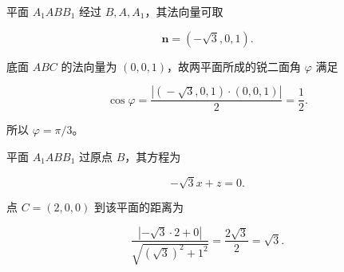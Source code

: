 \begin{answer}

平面 $A_1ABB_1$ 经过 $B,A,A_1$，其法向量可取

\nopagebreak[4]
\[
\boldsymbol n=(-\sqrt3,0,1).
\]

底面 $ABC$ 的法向量为 $(0,0,1)$，故两平面所成的锐二面角 $\varphi$ 满足

\nopagebreak[4]
\[
\cos\varphi
=\frac{|(\!-\sqrt3,0,1)\cdot(0,0,1)|}{2}
=\frac12.
\]

所以 $\varphi=\pi/3$。


平面 $A_1ABB_1$ 过原点 $B$，其方程为

\nopagebreak[4]
\[
-\sqrt3x+z=0.
\]

点 $C=(2,0,0)$ 到该平面的距离为

\nopagebreak[4]
\[
\frac{|-\sqrt3\cdot2+0|}{\sqrt{(\sqrt3)^2+1^2}}
=\frac{2\sqrt3}{2}
=\sqrt3.
\]




\end{answer}
